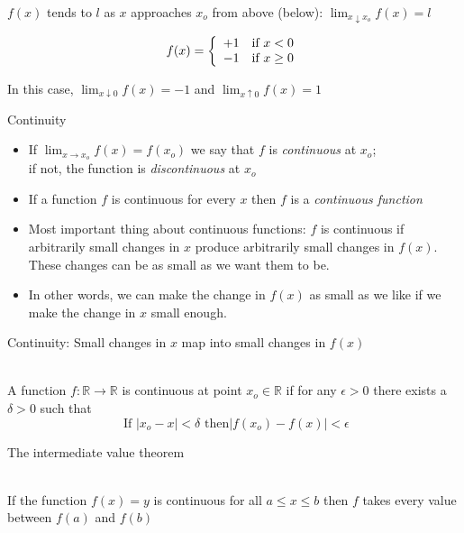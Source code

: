 \documentclass[10pt]{seminar}
\begin{document}
\begin{slide}
\ \\$f(x)$ tends to $l$ as $x$ approaches $x_o$ from above (below): $\lim_{x\downarrow x_o}f(x)=l$

 \[
    f(x)=\left\{
                \begin{array}{lll}
                  +1&\hbox{if } x<0\\
                  -1&\hbox{if } x\geq 0
                \end{array}
              \right.
  \]
  
  
  
In this case, $\lim_{x\downarrow 0}f(x)=-1$ and $\lim_{x\uparrow 0}f(x)=1$
  
  \begin{center}
\end{center}


\newslide
Continuity

\begin{itemize}
\item If $\lim_{x\rightarrow x_o}f(x)=f(x_o)$ we say that $f$ is \textit{continuous} at $x_o$; \\if not, the function is \textit{discontinuous} at $x_o$
\item If a function $f$ is continuous for every $x$ then $f$ is a \textit{continuous function}
\item Most important thing about continuous functions: $f$ is continuous if arbitrarily small changes in $x$ produce arbitrarily small changes in $f(x)$. These changes can be as small as we want them to be.

\item In other words, we can make the change in $f(x) $ as small as we like if we make the change in $x$ small enough.


\end{itemize}

\newslide

Continuity: Small changes in $x$ map into small changes in $f(x)$


\ \\ A function $f: \mathbb{R}\rightarrow \mathbb{R}$ is continuous at point $x_o\in \mathbb{R}$ if for any $\epsilon>0$ there exists a $\delta>0$ such that $$\text{ If } |x_o-x|<\delta \text{ then} |f(x_o)-f(x)|<\epsilon$$



\newslide
The intermediate value theorem

\ \\If the function $f(x)=y$ is continuous for all $a\leq x\leq b$ then $f$ takes every value between $f(a)$ and $f(b)$

\begin{center}

\end{center}
\end{slide}
\end{document}

